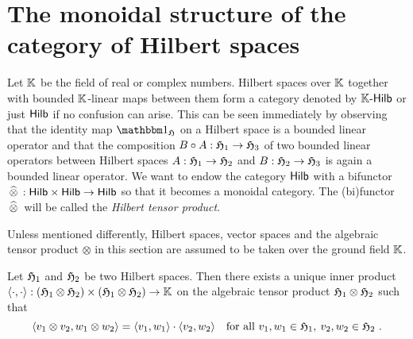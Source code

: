 %
\section{The monoidal structure of the category of Hilbert spaces}
\label{sec:monoidal-structure-category-hilbert-spaces}
%
\para 
Let $\mathbb{K}$ be the field of real or complex numbers. 
Hilbert spaces over $\mathbb{K}$ together with bounded $\mathbb{K}$-linear maps 
between them form a category denoted by $\mathbb{K}\text{-}\mathsf{Hilb}$
or just $\mathsf{Hilb}$ if no confusion can arise. This can be seen
immediately by observing that the identity map $\idn_\hilbertH$ on a Hilbert space
is a bounded linear operator  and that the composition $B \circ A : \mathfrak{H}_1 \to\mathfrak{H}_3$
of two bounded linear operators between Hilbert spaces 
$A:\mathfrak{H}_1 \to \mathfrak{H}_2 $ and $B :\mathfrak{H}_2 \to \mathfrak{H}_3$ is again a  
bounded linear operator. 
We want to endow the category $\mathsf{Hilb}$ with a bifunctor 
$ {\,\widehat{\otimes}\,} : \mathsf{Hilb} \times \mathsf{Hilb} \to \mathsf{Hilb}$
so that it becomes a monoidal category. The (bi)functor ${\,\widehat{\otimes}\,}$ will be 
called the \emph{Hilbert tensor product}.

Unless mentioned differently, Hilbert spaces, vector spaces and the algebraic tensor product $\otimes$
in this section are assumed to be taken over the ground field $\mathbb{K}$. 

\begin{proposition}
\label{thm:construction-tensor-inner-product}  
 Let $\mathfrak{H}_1$ and $\mathfrak{H}_2$ be two Hilbert spaces. 
 Then there exists a unique inner product 
 $\langle \cdot,\cdot \rangle: (\mathfrak{H}_1 \otimes \mathfrak{H}_2) \times (\mathfrak{H}_1 \otimes \mathfrak{H}_2)
  \to \mathbb{K} $ on the algebraic tensor product $\mathfrak{H}_1\otimes \mathfrak{H}_2$ such that
  \begin{equation}
    \label{eq:defining-relation-inner-product-tensor-product}
    \langle v_1 \otimes v_2 , w_1 \otimes w_2 \rangle =  \langle v_1,w_1 \rangle \cdot \langle v_2,w_2 \rangle 
    \quad\text{for all } v_1,w_1 \in \mathfrak{H}_1, \: v_2,w_2 \in \mathfrak{H}_2 \ .  
  \end{equation}
\end{proposition}

